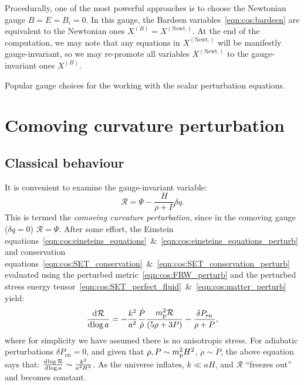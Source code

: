 Procedurally, one of  the most powerful approaches is to choose the Newtonian gauge \({B=E=B_i=0}\). In this gauge, the Bardeen variables~\eqref{eqn:cos:bardeen} are equivalent to the Newtonian ones \(X^{(B)}=X^{(\text{Newt.})}\). At the end of the computation, we may note that any equations in \(X^{(\text{Newt.})}\) will be manifestly gauge-invariant, so we may re-promote all variables \(X^{(\text{Newt.})}\) to the gauge-invariant ones \(X^{(B)}\).


\begin{table}[tp]
  \centering
  
\caption{Popular gauge choices for the working with the scalar perturbation equations.}\label{tab:cos:gauge_choice}
\end{table}

\section{Comoving curvature perturbation}
\label{sec:cos:comoving_curvature_perturbation}

\subsection{Classical behaviour}
\label{sec:cos:freeze_out}
It is convenient to examine the gauge-invariant variable:
\begin{equation}
  \mathcal{R} = \Psi - \frac{H}{\rho+P}\delta q.
  \label{eqn:cos:CCP}
\end{equation}
This is termed the {\em comoving curvature perturbation}, since in the comoving gauge (\(\delta q=0\)) \(\mathcal{R}=\Psi\).
After some effort, the Einstein equations~\eqref{eqn:cos:einsteins_equations}~\&~\eqref{eqn:cos:einsteins_equations_perturb} and conservation equations~\eqref{eqn:cos:SET_conservation}~\&~\eqref{eqn:cos:SET_conservation_perturb} evaluated using the perturbed metric~\eqref{eqn:cos:FRW_perturb} and the perturbed stress energy tensor~\eqref{eqn:cos:SET_perfect_fluid}~\&~\eqref{eqn:cos:matter_perturb} yield:
\begin{equation}
  \frac{\operatorname{d}^{}\!{\mathcal{R}}}{\operatorname{d}^{}\!{\log a}} = 
  -\frac{k^2}{a^2}\frac{\dot{P}}{\dot{\rho}}\frac{m_{\mathrm{p}}^2\mathcal{R}}{(5\rho + 3P)}
  -\frac{\delta P_\mathrm{en}}{\rho+P},
\end{equation}
where for simplicity we have assumed there is no anisotropic stress. For adiabatic perturbations \(\delta P_\mathrm{en}=0\), and given that \(\rho,P\sim m_{\mathrm{p}}^2 H^2\), \(\dot{\rho}\sim\dot{P}\), the above equation says that: \(\frac{\operatorname{d}^{}\!{\log \mathcal{R}}}{\operatorname{d}^{}\!{\log a}} \sim \frac{k^2}{a^2H^2}\). As the universe inflates, \(k\ll aH\), and \(\mathcal{R}\) ``freezes out'' and becomes constant.

